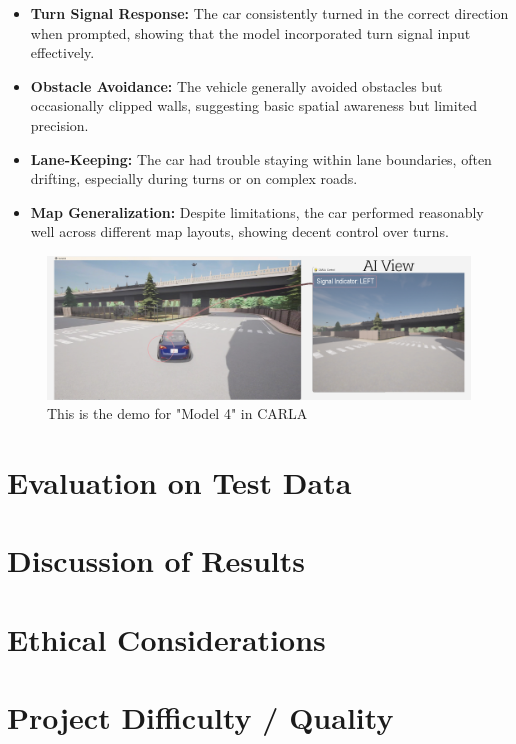 \documentclass{article} %
\begin{document}
\begin{itemize}
  \item \textbf{Turn Signal Response:} The car consistently turned in the correct direction when prompted, showing that the model incorporated turn signal input effectively.

  \item \textbf{Obstacle Avoidance:} The vehicle generally avoided obstacles but occasionally clipped walls, suggesting basic spatial awareness but limited precision.

  \item \textbf{Lane-Keeping:} The car had trouble staying within lane boundaries, often drifting, especially during turns or on complex roads.

  \item \textbf{Map Generalization:} Despite limitations, the car performed reasonably well across different map layouts, showing decent control over turns.
\end{itemize}


\begin{figure}[H] %
    \centering
    \includegraphics[width=1.0\textwidth]{model4demo.png} %
    \caption{This is the demo for "Model 4" in CARLA}
    \label{fig:model4demo}
\end{figure}


\section{Evaluation on Test Data}

\section{Discussion of Results}

\section{Ethical Considerations}

\section{Project Difficulty / Quality}


\label{last_page}



\end{document}
